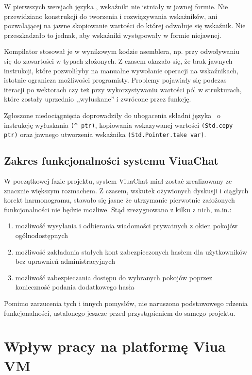 W pierwszych wersjach języka \ViuAct, wskaźniki nie istniały w jawnej formie.
Nie przewidziano konstrukcji do tworzenia i rozwiązywania wskażników, ani
pozwalającej na jawne skopiowanie wartości do której odwołuje się wskaźnik.
Nie przeszkadzało to jednak, aby wskaźniki występowały w formie niejawnej.

Kompilator stosował je w wynikowym kodzie asemblera, np. przy odwoływaniu się do
zawartości w typach złożonych. Z czasem okazało się, że brak jawnych instrukcji,
które pozwoliłyby na manualne wywołanie operacji na wskaźnikach, istotnie
ogranicza możliwości programisty. Problemy pojawiały się podczas iteracji po
wektorach czy też przy wykorzystywaniu wartości pól w strukturach, które zostały
uprzednio ,,wyłuskane'' i zwrócone przez funkcję.

Zgłoszone niedociągnięcia doprowadziły do ubogacenia składni języka \ViuAct\ o
instrukcję wyłuskania \texttt{(\^~ptr)}, kopiowania wskazywanej wartości
\texttt{(Std.copy ptr)} oraz jawnego utworzenia wskaźnika
\texttt{(Std.Pointer.take var)}.

\subsection{Zakres funkcjonalności systemu ViuaChat}

W początkowej fazie projektu, system ViuaChat miał zostać zrealizowany ze
znacznie większym rozmachem. Z czasem, wskutek ożywionych dyskusji i ciągłych
korekt harmonogramu, stawało się jasne że utrzymanie pierwotnie założonych
funkcjonalności nie będzie możliwe. Stąd zrezygnowano z kilku z nich, m.in.:

\begin{enumerate}
    \item możliwość wysyłania i odbierania wiadomości prywatnych z okien pokojów
        ogólnodostępnych
    \item możliwość zakładania stałych kont zabezpieczonych hasłem dla
        użytkowników bez uprawnień administracyjnych
    \item możliwość zabezpieczania dostępu do wybranych pokojów poprzez
        konieczność podania dodatkowego hasła
\end{enumerate}

Pomimo zarzucenia tych i innych pomysłów, nie naruszono podstawowego rdzenia
funkcjonalności, ustalonego jeszcze przed przystąpieniem do samego projektu.

\section{Wpływ pracy na platformę Viua VM}

